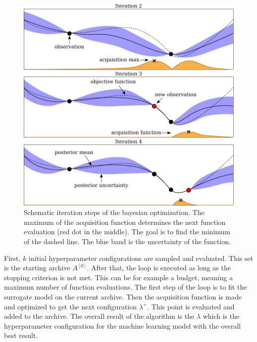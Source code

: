 \begin{figure}[H]
	\centering
	\includegraphics[width=\textwidth]{figures/Fig_2_4_bayesian}
	\caption{ Schematic iteration steps of the bayesian optimization. The maximum of the acquisition function determines the next function evaluation (red dot in the middle). The goal is to find the minimum of the dashed line. The blue band is the uncertainty of the function. }
	\label{fig:bayesian_optimization}
\end{figure}


First, $ k $ initial hyperparameter configurations are sampled and evaluated. This set is the starting archive $ A^{[0]} $. After that, the loop is executed as long as the stopping criterion is not met. This can be for example a budget, meaning a maximum number of function evaluations. The first step of the loop is to fit the surrogate model on the current archive. Then the acquisition function is made and optimized to get the next configuration $ \lambda^+ $. This point is evaluated and added to the archive. The overall result of the algorithm is the $ \lambda $ which is the hyperparameter configuration for the machine learning model with the overall best result.

